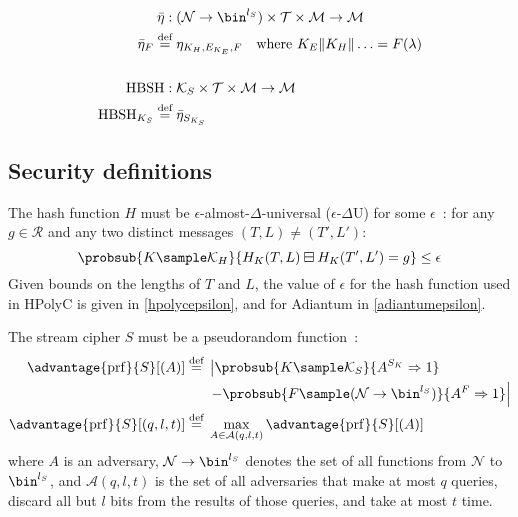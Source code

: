 \documentclass[eprint.tex]{subfiles}
\begin{document}
\begin{align*}
    \bar{\eta} :{}& (\mathcal{N} \rightarrow \bin^{l_S}) \times \mathcal{T} \times \mathcal{M} \rightarrow \mathcal{M} \\
    \bar{\eta}_{F} \defeq{}& \eta_{K_H, E_{K_E}, F} \quad \textrm{where} \ K_E \Concat K_H \Concat \ldots = F(\lambda) \\
    \allowdisplaybreaks[4] \vphantom{|} \\ \allowdisplaybreaks[0]
    \HBSH :{}& \mathcal{K}_S \times \mathcal{T} \times \mathcal{M} \rightarrow \mathcal{M} \\
    \HBSH_{K_S} \defeq{}& \bar{\eta}_{S_{K_S}} \\
\end{align*}

\subsection{Security definitions}
The hash function $H$
must be $\epsilon$-almost-$\Delta$-universal\label{eadudef}
($\epsilon$-$\Delta$U)
for some $\epsilon$~\cite{eadu}:
for any $g \in \mathcal{R}$ and
any two distinct messages $(T, L) \neq (T', L')$:
%
\begin{displaymath}
\probsub{K \sample \mathcal{K}_H}{H_{K}(T, L) \boxminus H_{K}(T', L') = g} \leq \epsilon
\end{displaymath}
%
Given bounds on the lengths of $T$ and $L$, the value of $\epsilon$ for the
hash function used in HPolyC is given in \autoref{hpolycepsilon},
and for Adiantum in \autoref{adiantumepsilon}.

The stream cipher $S$
must be a pseudorandom function~\cite{concsym}:
%
\begin{align*}
    \advantage{\mathrm{prf}}{S}[(A)] \defeq
    {}&\left\lvert \probsub{K \sample \mathcal{K}_S}{A^{S_{K}}\Rightarrow 1}\right.
    \\
    {}&\left. - \probsub{F \sample (\mathcal{N} \rightarrow \bin^{l_S})}
    {A^F\Rightarrow 1} \right\rvert
    \\
    \advantage{\mathrm{prf}}{S}[(q, l, t)]
    \defeq {}&\max_{A \in \mathcal{A}(q, l, t)} \advantage{\mathrm{prf}}{S}[(A)]
\end{align*}
%
where $A$ is an adversary,
$\mathcal{N} \rightarrow \bin^{l_S}$ denotes the set of all
functions from $\mathcal{N}$ to $\bin^{l_S}$,
and
$\mathcal{A}(q, l, t)$
is the set of all adversaries that make at most $q$ queries, discard all but $l$ bits from
the results of those queries, and take at most $t$ time.
\end{document}
